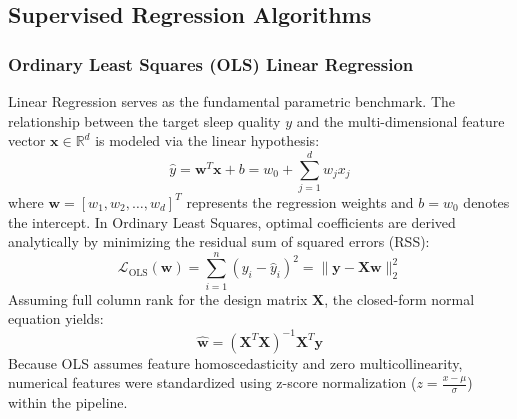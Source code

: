 \documentclass[12pt,a4paper]{article}
\begin{document}
\subsection{Supervised Regression Algorithms}

\subsubsection{Ordinary Least Squares (OLS) Linear Regression}
Linear Regression serves as the fundamental parametric benchmark. The relationship between the target sleep quality $y$ and the multi-dimensional feature vector $\mathbf{x} \in \mathbb{R}^d$ is modeled via the linear hypothesis:
\begin{equation}
    \hat{y} = \mathbf{w}^T \mathbf{x} + b = w_0 + \sum_{j=1}^d w_j x_j
\end{equation}
where $\mathbf{w} = [w_1, w_2, \dots, w_d]^T$ represents the regression weights and $b = w_0$ denotes the intercept. In Ordinary Least Squares, optimal coefficients are derived analytically by minimizing the residual sum of squared errors (RSS):
\begin{equation}
    \mathcal{L}_{\text{OLS}}(\mathbf{w}) = \sum_{i=1}^n \left( y_i - \hat{y}_i \right)^2 = \|\mathbf{y} - \mathbf{X}\mathbf{w}\|_2^2
\end{equation}
Assuming full column rank for the design matrix $\mathbf{X}$, the closed-form normal equation yields:
\begin{equation}
    \hat{\mathbf{w}} = \left( \mathbf{X}^T \mathbf{X} \right)^{-1} \mathbf{X}^T \mathbf{y}
\end{equation}
Because OLS assumes feature homoscedasticity and zero multicollinearity, numerical features were standardized using z-score normalization ($z = \frac{x - \mu}{\sigma}$) within the pipeline.
\end{document}
